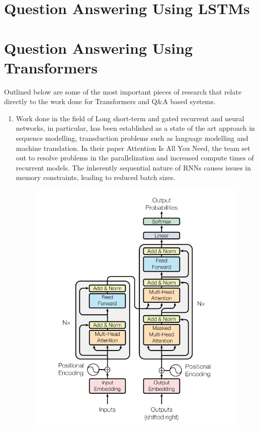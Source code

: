 \documentclass[12pt]{report}
\begin{document}
        \section{Question Answering Using LSTMs}\label{22}
        \section{Question Answering Using Transformers}\label{23}
        Outlined below are some of the most important pieces of research that relate directly to the work done for Transformers and Q\&A based systems.
        \begin{enumerate}

            \item Work done in the field of Long short-term and gated recurrent \citep{lstm} and \citep{recurrent} neural networks, in particular, has been established as a state of the art approach in sequence modelling, transduction problems such as language modelling and machine translation.
            In their paper Attention Is All You Need,\citep{atayl} the team set out to resolve problems in the parallelization and increased compute times of recurrent models. The inherently sequential nature of RNNs causes issues in memory constraints, leading to reduced batch sizes.\\
            \begin{figure}[h!]
                \centering
                \includegraphics[scale=0.25]{transformer.png}

\end{figure}
\end{enumerate}
\end{document}
